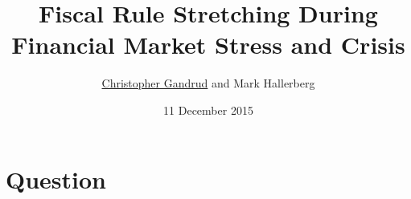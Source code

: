 \documentclass[10pt, compress]{beamer}
\title[Stretching]{Fiscal Rule Stretching During Financial Market Stress and Crisis}
\subtitle{}
\date{11 December 2015}
\author{
    \href{mailto:christopher.gandrud@city.ac.uk}{Christopher Gandrud}
    and Mark Hallerberg
}
\institute{City University London, Hertie School of Governance }
\begin{document}
\maketitle

\section{Question}

\end{document}

